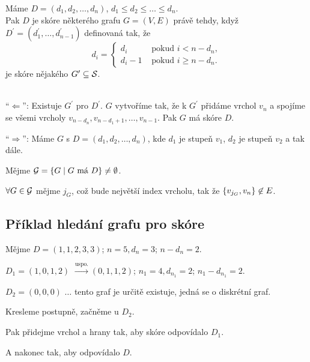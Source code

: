  Máme $D = (d_1, d_2, \dots, d_n)$, $d_1 \leq d_2 \leq \dots \leq d_n$. \\
Pak $D$ je skóre některého grafu $G = (V,E)$ právě tehdy, když $D^\prime = (d_1^\prime, \dots, d_{n-1}^\prime)$ 
definovaná tak, že
\[
    d_i = 
    \begin{cases}
        d_i &\text{ pokud } i < n-d_n, \\
        d_i-1  &\text{ pokud } i \geq n-d_n.
    \end{cases}
\]
je skóre nějakého $G^\prime \subseteq \S$.

\\
\enquote{$\Leftarrow$}: Existuje $G^\prime$ pro $D^\prime$. $G$ vytvoříme tak, že k $G^\prime$ přidáme vrchol $v_n$ a 
spojíme se všemi vrcholy $v_{n-d_n}, v_{n-d_1+1}, \dots, v_{n-1}$. Pak $G$ má skóre $D$.

\enquote{$\Rightarrow$}: Máme $G$ s $D = (d_1, d_2, \dots, d_n)$, kde $d_1$ je stupeň $v_1$, $d_2$ je stupeň $v_2$ a tak 
dále.

Mějme $\G = \bc{G \mid G \text{ má } D} \not= \emptyset$.

$\forall G \in \G$ mějme $j_G$, což bude největší index vrcholu, tak že $\bc{v_{j_G}, v_n} \not\in E$.

\subsection{Příklad hledání grafu pro skóre}
Mějme $D = (1,1,2,3,3)$; $n=5, d_n=3$; $n-d_n=2$.

$D_1 = (1,0,1,2)$ $\overset{\text{uspo.}}{\rightarrow} (0,1,1,2)$; $n_1=4, d_{n_1} = 2$; $n_1 - d_{n_1}=2$.

$D_2 = (0, 0, 0)$ $\dots$ tento graf je určitě existuje, jedná se o diskrétní graf.

Kresleme postupně, začněme u $D_2$.
\begin{figure}[H]
\end{figure}
Pak přidejme vrchol a hrany tak, aby skóre odpovídalo $D_1$.
\begin{figure}[H]
\end{figure}
A nakonec tak, aby odpovídalo $D$.
\begin{figure}[H]
\end{figure}

